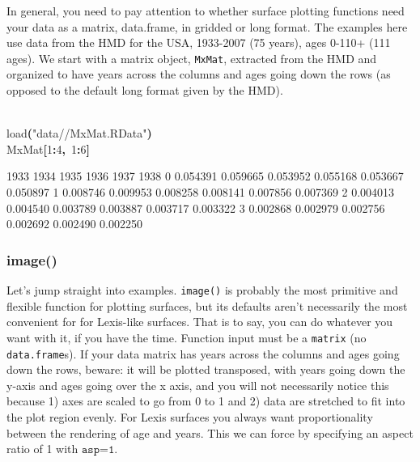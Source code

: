 \documentclass[a4paper]{article}
\newcommand{\hlnumber}[1]{\textcolor[rgb]{0.0823529411764706,0.0784313725490196,0.709803921568627}{#1}}%
\newcommand{\hlfunctioncall}[1]{\textcolor[rgb]{1,0,0}{#1}}%
\newcommand{\hlstring}[1]{\textcolor[rgb]{0.6,0.6,1}{#1}}%
\newcommand{\hlkeyword}[1]{\textcolor[rgb]{0,0,0}{\textbf{#1}}}%
\newcommand{\hlsymbol}[1]{\textcolor[rgb]{0,0,0}{#1}}%
\newcommand{\hlprompt}[1]{\textcolor[rgb]{0,0,0}{#1}}%
\newcommand{\hlstd}[1]{\textcolor[rgb]{0,0,0}{#1}}%
\newenvironment{Houtput}{\raggedright}{%
%
}
\renewenvironment{Schunk}{\vspace{\topsep}}{\vspace{\topsep}}
\begin{document}
In general, you need to pay attention to whether surface plotting functions need your data as a matrix, data.frame, in gridded or long format. The examples here use data from the HMD for the USA, 1933-2007 (75 years), ages 0-110+ (111 ages). We start with a matrix object, \texttt{MxMat}, extracted from the HMD and organized to have years across the columns and ages going down the rows (as opposed to the default long format given by the HMD).

\begin{Houtput}
\hspace*{\fill}\\
\hlstd{}\ttfamily\noindent
\hlprompt{\usebox{\hlnormalsizeboxgreaterthan}{\ }}\hlfunctioncall{load}\hlkeyword{(}\hlstring{"data//MxMat.RData"}\hlkeyword{)}\mbox{}
\normalfont
\hspace*{\fill}\\
\hlstd{}\ttfamily\noindent
\hlprompt{\usebox{\hlnormalsizeboxgreaterthan}{\ }}\hlsymbol{MxMat}\hlkeyword{[}\hlnumber{1}\hlkeyword{:}\hlnumber{4}\hlkeyword{,}{\ }\hlnumber{1}\hlkeyword{:}\hlnumber{6}\hlkeyword{]}\mbox{}
\normalfont
\hspace*{\fill}\\
\hlstd{}\begin{Schunk}
\begin{Soutput}
      1933     1934     1935     1936     1937     1938
0 0.054391 0.059665 0.053952 0.055168 0.053667 0.050897
1 0.008746 0.009953 0.008258 0.008141 0.007856 0.007369
2 0.004013 0.004540 0.003789 0.003887 0.003717 0.003322
3 0.002868 0.002979 0.002756 0.002692 0.002490 0.002250
\end{Soutput}

\end{Schunk}
\end{Houtput}


\subsubsection{image()}
Let's jump straight into examples. \texttt{image()} is probably the most primitive and flexible function for plotting surfaces, but its defaults aren't necessarily the most convenient for for Lexis-like surfaces. That is to say, you can do whatever you want with it, if you have the time. Function input must be a \texttt{matrix} (no \texttt{data.frame}s). If your data matrix has years across the columns and ages going down the rows, beware: it will be plotted transposed, with years going down the y-axis and ages going over the x axis, and you will not necessarily notice this because 1) axes are scaled to go from 0 to 1 and 2) data are stretched to fit into the plot region evenly. For Lexis surfaces you always want proportionality between the rendering of age and years. This we can force by specifying an aspect ratio of 1 with $\texttt{asp=1}$.
\end{document}
